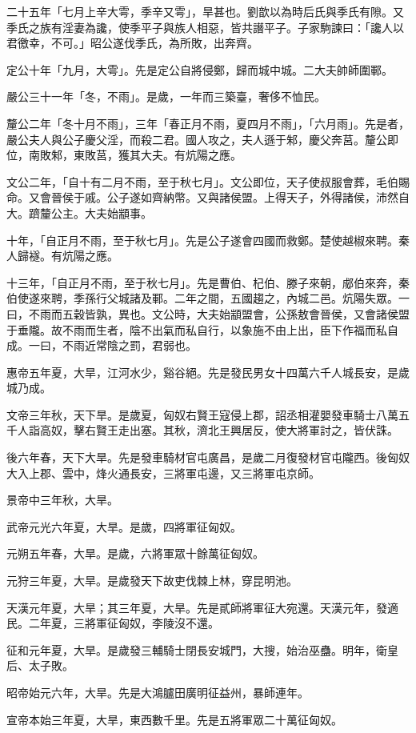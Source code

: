\begin{pinyinscope}
二十五年「七月上辛大雩，季辛又雩」，旱甚也。劉歆以為時后氏與季氏有隙。又季氏之族有淫妻為讒，使季平子與族人相惡，皆共譖平子。子家駒諫曰：「讒人以君徼幸，不可。」昭公遂伐季氏，為所敗，出奔齊。

定公十年「九月，大雩」。先是定公自將侵鄭，歸而城中城。二大夫帥師圍鄆。

嚴公三十一年「冬，不雨」。是歲，一年而三築臺，奢侈不恤民。

釐公二年「冬十月不雨」，三年「春正月不雨，夏四月不雨」，「六月雨」。先是者，嚴公夫人與公子慶父淫，而殺二君。國人攻之，夫人遜于邾，慶父奔莒。釐公即位，南敗邾，東敗莒，獲其大夫。有炕陽之應。

文公二年，「自十有二月不雨，至于秋七月」。文公即位，天子使叔服會葬，毛伯賜命。又會晉侯于戚。公子遂如齊納幣。又與諸侯盟。上得天子，外得諸侯，沛然自大。躋釐公主。大夫始顓事。

十年，「自正月不雨，至于秋七月」。先是公子遂會四國而救鄭。楚使越椒來聘。秦人歸襚。有炕陽之應。

十三年，「自正月不雨，至于秋七月」。先是曹伯、杞伯、滕子來朝，郕伯來奔，秦伯使遂來聘，季孫行父城諸及鄆。二年之間，五國趨之，內城二邑。炕陽失眾。一曰，不雨而五穀皆孰，異也。文公時，大夫始顓盟會，公孫敖會晉侯，又會諸侯盟于垂隴。故不雨而生者，陰不出氣而私自行，以象施不由上出，臣下作福而私自成。一曰，不雨近常陰之罰，君弱也。

惠帝五年夏，大旱，江河水少，谿谷絕。先是發民男女十四萬六千人城長安，是歲城乃成。

文帝三年秋，天下旱。是歲夏，匈奴右賢王寇侵上郡，詔丞相灌嬰發車騎士八萬五千人詣高奴，擊右賢王走出塞。其秋，濟北王興居反，使大將軍討之，皆伏誅。

後六年春，天下大旱。先是發車騎材官屯廣昌，是歲二月復發材官屯隴西。後匈奴大入上郡、雲中，烽火通長安，三將軍屯邊，又三將軍屯京師。

景帝中三年秋，大旱。

武帝元光六年夏，大旱。是歲，四將軍征匈奴。

元朔五年春，大旱。是歲，六將軍眾十餘萬征匈奴。

元狩三年夏，大旱。是歲發天下故吏伐棘上林，穿昆明池。

天漢元年夏，大旱；其三年夏，大旱。先是貳師將軍征大宛還。天漢元年，發適民。二年夏，三將軍征匈奴，李陵沒不還。

征和元年夏，大旱。是歲發三輔騎士閉長安城門，大搜，始治巫蠱。明年，衛皇后、太子敗。

昭帝始元六年，大旱。先是大鴻臚田廣明征益州，暴師連年。

宣帝本始三年夏，大旱，東西數千里。先是五將軍眾二十萬征匈奴。


\end{pinyinscope}
